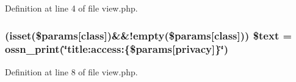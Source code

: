 Definition at line 4 of file view.\+php.

\subsubsection[{\texorpdfstring{\$text}{$text}}]{ (isset(\$params\mbox{[}\textquotesingle{}class\textquotesingle{}\mbox{]})\&\&!empty(\$params\mbox{[}\textquotesingle{}class\textquotesingle{}\mbox{]})) \$text = {\bf ossn\+\_\+print}(\char`\"{}title\+:access\+:\{\$params\mbox{[}\textquotesingle{}privacy\textquotesingle{}\mbox{]}\}\char`\"{})}\hypertarget{system_2plugins_2default_2privacy_2icon_2view_8php_a7e35dafe151db63470e8b2e8bc4cbc33}{}\label{system_2plugins_2default_2privacy_2icon_2view_8php_a7e35dafe151db63470e8b2e8bc4cbc33}


Definition at line 8 of file view.\+php.


